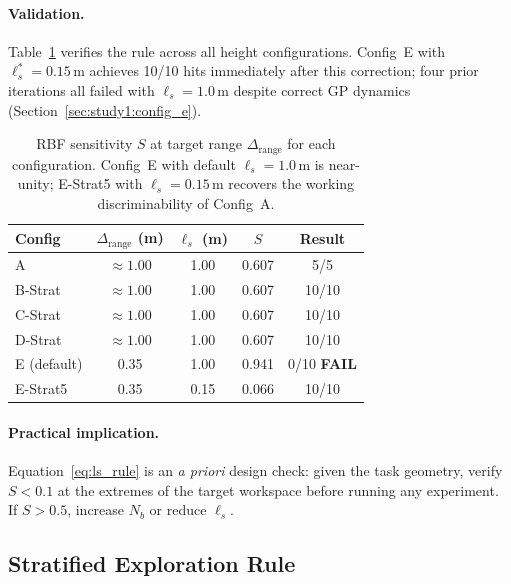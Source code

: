 \paragraph{Validation.}
Table~\ref{tab:sensitivity} verifies the rule across all height configurations.
Config~E with $\ell_s^* = 0.15$\,m achieves 10/10 hits immediately after this
correction; four prior iterations all failed with $\ell_s = 1.0$\,m despite correct
GP dynamics (Section~\ref{sec:study1:config_e}).

\begin{table}[t]
  \centering
  \caption{RBF sensitivity $S$ at target range $\Delta_{\mathrm{range}}$ for each
           configuration.
           Config~E with default $\ell_s = 1.0$\,m is near-unity; E-Strat5 with
           $\ell_s = 0.15$\,m recovers the working discriminability of Config~A.}
  \label{tab:sensitivity}
  \small
  \begin{tabular}{lcccc}
    \toprule
    Config & $\Delta_{\mathrm{range}}$ (m) & $\ell_s$ (m) & $S$ & Result \\
    \midrule
    A              & $\approx 1.00$ & 1.00 & 0.607 & 5/5 \\
    B-Strat        & $\approx 1.00$ & 1.00 & 0.607 & 10/10 \\
    C-Strat        & $\approx 1.00$ & 1.00 & 0.607 & 10/10 \\
    D-Strat        & $\approx 1.00$ & 1.00 & 0.607 & 10/10 \\
    E (default)    & 0.35           & 1.00 & 0.941 & 0/10 \textbf{FAIL} \\
    E-Strat5       & 0.35           & 0.15 & 0.066 & 10/10 \\
    \bottomrule
  \end{tabular}
\end{table}

\paragraph{Practical implication.}
Equation~\eqref{eq:ls_rule} is an \emph{a priori} design check: given the task geometry,
verify $S < 0.1$ at the extremes of the target workspace before running any experiment.
If $S > 0.5$, increase $N_b$ or reduce $\ell_s$.

\subsection{Stratified Exploration Rule}
\label{sec:convergence:stratified}

